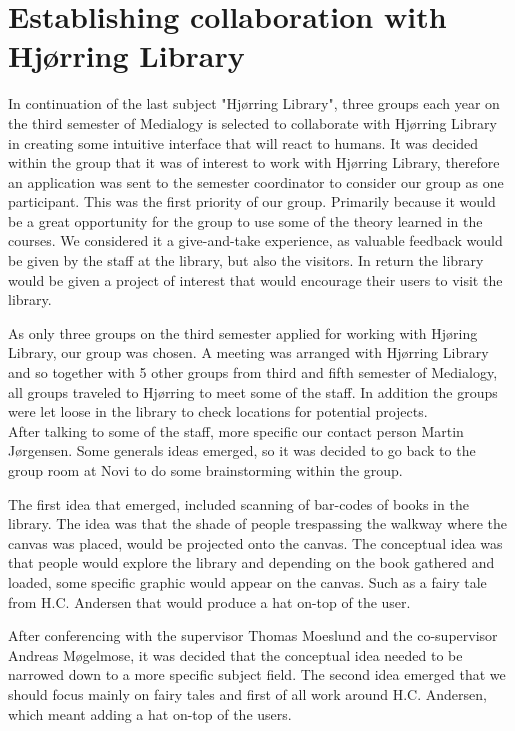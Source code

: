 \section{Establishing collaboration with Hjørring Library}
In continuation of the last subject "Hjørring Library", three groups each year on the third semester of Medialogy is selected to collaborate with Hjørring Library in creating some intuitive interface that will react to humans. It was decided within the group that it was of interest to work with Hjørring Library, therefore an application was sent to the semester coordinator to consider our group as one participant. This was the first priority of our group. Primarily because it would be a great opportunity for the group to use some of the theory learned in the courses. We considered it a give-and-take experience, as valuable feedback would be given by the staff at the library, but also the visitors. In return the library would be given a project of interest that would encourage their users to visit the library.

As only three groups on the third semester applied for working with Hjøring Library, our group was chosen. A meeting was arranged with Hjørring Library and so together with 5 other groups from third and fifth semester of Medialogy, all groups traveled to Hjørring to meet some of the staff. In addition the groups were let loose in the library to check locations for potential projects.\\
After talking to some of the staff, more specific our contact person Martin Jørgensen. Some generals ideas emerged, so it was decided to go back to the group room at Novi to do some brainstorming within the group.

The first idea that emerged, included scanning of bar-codes of books in the library. The idea was that the shade of people trespassing the walkway where the canvas was placed, would be projected onto the canvas. The conceptual idea was that people would explore the library and depending on the book gathered and loaded, some specific graphic would appear on the canvas. Such as a fairy tale from H.C. Andersen that would produce a hat on-top of the user.

After conferencing with the supervisor Thomas Moeslund and the co-supervisor Andreas Møgelmose, it was decided that the conceptual idea needed to be narrowed down to a more specific subject field. The second idea emerged that we should focus mainly on fairy tales and first of all work around H.C. Andersen, which meant adding a hat on-top of the users.

